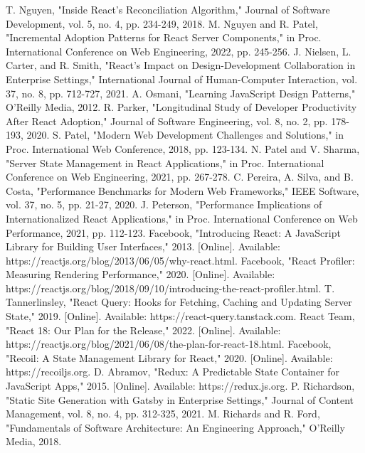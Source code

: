\begin{thebibliography}{00}
 T. Nguyen, "Inside React's Reconciliation Algorithm," Journal of Software Development, vol. 5, no. 4, pp. 234-249, 2018.
 M. Nguyen and R. Patel, "Incremental Adoption Patterns for React Server Components," in Proc. International Conference on Web Engineering, 2022, pp. 245-256.
 J. Nielsen, L. Carter, and R. Smith, "React's Impact on Design-Development Collaboration in Enterprise Settings," International Journal of Human-Computer Interaction, vol. 37, no. 8, pp. 712-727, 2021.
 A. Osmani, "Learning JavaScript Design Patterns," O'Reilly Media, 2012.
 R. Parker, "Longitudinal Study of Developer Productivity After React Adoption," Journal of Software Engineering, vol. 8, no. 2, pp. 178-193, 2020.
 S. Patel, "Modern Web Development Challenges and Solutions," in Proc. International Web Conference, 2018, pp. 123-134.
 N. Patel and V. Sharma, "Server State Management in React Applications," in Proc. International Conference on Web Engineering, 2021, pp. 267-278.
 C. Pereira, A. Silva, and B. Costa, "Performance Benchmarks for Modern Web Frameworks," IEEE Software, vol. 37, no. 5, pp. 21-27, 2020.
 J. Peterson, "Performance Implications of Internationalized React Applications," in Proc. International Conference on Web Performance, 2021, pp. 112-123.
 Facebook, "Introducing React: A JavaScript Library for Building User Interfaces," 2013. [Online]. Available: https://reactjs.org/blog/2013/06/05/why-react.html.
 Facebook, "React Profiler: Measuring Rendering Performance," 2020. [Online]. Available: https://reactjs.org/blog/2018/09/10/introducing-the-react-profiler.html.
 T. Tannerlinsley, "React Query: Hooks for Fetching, Caching and Updating Server State," 2019. [Online]. Available: https://react-query.tanstack.com.
 React Team, "React 18: Our Plan for the Release," 2022. [Online]. Available: https://reactjs.org/blog/2021/06/08/the-plan-for-react-18.html.
 Facebook, "Recoil: A State Management Library for React," 2020. [Online]. Available: https://recoiljs.org.
 D. Abramov, "Redux: A Predictable State Container for JavaScript Apps," 2015. [Online]. Available: https://redux.js.org.
 P. Richardson, "Static Site Generation with Gatsby in Enterprise Settings," Journal of Content Management, vol. 8, no. 4, pp. 312-325, 2021.
 M. Richards and R. Ford, "Fundamentals of Software Architecture: An Engineering Approach," O'Reilly Media, 2018.

\end{thebibliography}
